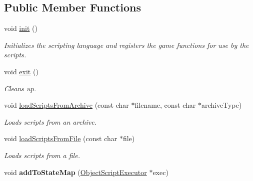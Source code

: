 \subsection*{\-Public \-Member \-Functions}
\begin{DoxyCompactItemize}
\item 
\hypertarget{classObjectScriptManager_a7f4ba81389394cab375bf0b30d620df1}{
void \hyperlink{classObjectScriptManager_a7f4ba81389394cab375bf0b30d620df1}{init} ()}
\label{d4/d09/classObjectScriptManager_a7f4ba81389394cab375bf0b30d620df1}

\begin{DoxyCompactList}\small\item\em \-Initializes the scripting language and registers the game functions for use by the scripts. \end{DoxyCompactList}\item 
\hypertarget{classObjectScriptManager_aa6fdee490e01fa2af2437e4b73baa23a}{
void \hyperlink{classObjectScriptManager_aa6fdee490e01fa2af2437e4b73baa23a}{exit} ()}
\label{d4/d09/classObjectScriptManager_aa6fdee490e01fa2af2437e4b73baa23a}

\begin{DoxyCompactList}\small\item\em \-Cleans up. \end{DoxyCompactList}\item 
\hypertarget{classObjectScriptManager_a5ad4715832f85b153aa60e110462fa68}{
void \hyperlink{classObjectScriptManager_a5ad4715832f85b153aa60e110462fa68}{load\-Scripts\-From\-Archive} (const char $\ast$filename, const char $\ast$archive\-Type)}
\label{d4/d09/classObjectScriptManager_a5ad4715832f85b153aa60e110462fa68}

\begin{DoxyCompactList}\small\item\em \-Loads scripts from an archive. \end{DoxyCompactList}\item 
\hypertarget{classObjectScriptManager_a42d350f6ce221a0505c745c107e8552f}{
void \hyperlink{classObjectScriptManager_a42d350f6ce221a0505c745c107e8552f}{load\-Scripts\-From\-File} (const char $\ast$file)}
\label{d4/d09/classObjectScriptManager_a42d350f6ce221a0505c745c107e8552f}

\begin{DoxyCompactList}\small\item\em \-Loads scripts from a file. \end{DoxyCompactList}\item 
\hypertarget{classObjectScriptManager_ae79a63a3b04468493009e84a10b9c5d8}{
void {\bfseries add\-To\-State\-Map} (\hyperlink{classObjectScriptExecutor}{\-Object\-Script\-Executor} $\ast$exec)}
\label{d4/d09/classObjectScriptManager_ae79a63a3b04468493009e84a10b9c5d8}


\end{DoxyCompactItemize}
